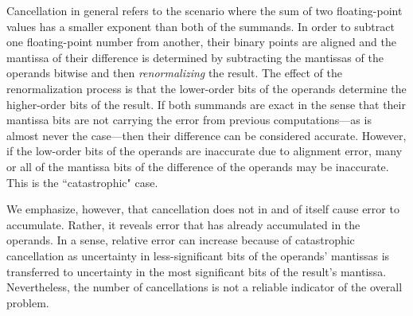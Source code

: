 Cancellation in general refers to the scenario where the sum of two
floating-point values has a smaller exponent than both of the
summands. In order to subtract one floating-point number from another,
their binary points are aligned and the mantissa of their difference
is determined by subtracting the mantissas of the operands bitwise and
then \emph{renormalizing} the result. The effect of the
renormalization process is that the lower-order bits of the operands
determine the higher-order bits of the result. If both summands are
exact in the sense that their mantissa bits are not carrying the error
from previous computations---as is almost never the case---then their
difference can be considered accurate. However, if the low-order bits
of the operands are inaccurate due to alignment error, many or all of
the mantissa bits of the difference of the operands may be
inaccurate. This is the ``catastrophic" case.

We emphasize, however, that cancellation does not in and of itself
cause error to accumulate. Rather, it reveals error that has already
accumulated in the operands. In a sense, relative error can increase
because of catastrophic cancellation as uncertainty in
less-significant bits of the operands' mantissas is transferred to
uncertainty in the most significant bits of the result's
mantissa. Nevertheless, the number of cancellations is not a reliable
indicator of the overall problem.

